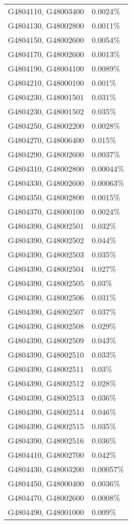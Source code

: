 \begin{longtable}[]{@{}ll@{}}
G4804110, G48003400 & 0.0024\% \\
G4804130, G48002800 & 0.0011\% \\
G4804150, G48002600 & 0.0054\% \\
G4804170, G48002600 & 0.0013\% \\
G4804190, G48004100 & 0.0089\% \\
G4804210, G48000100 & 0.001\% \\
G4804230, G48001501 & 0.031\% \\
G4804230, G48001502 & 0.035\% \\
G4804250, G48002200 & 0.0028\% \\
G4804270, G48006400 & 0.015\% \\
G4804290, G48002600 & 0.0037\% \\
G4804310, G48002800 & 0.00044\% \\
G4804330, G48002600 & 0.00063\% \\
G4804350, G48002800 & 0.0015\% \\
G4804370, G48000100 & 0.0024\% \\
G4804390, G48002501 & 0.032\% \\
G4804390, G48002502 & 0.044\% \\
G4804390, G48002503 & 0.035\% \\
G4804390, G48002504 & 0.027\% \\
G4804390, G48002505 & 0.03\% \\
G4804390, G48002506 & 0.031\% \\
G4804390, G48002507 & 0.037\% \\
G4804390, G48002508 & 0.029\% \\
G4804390, G48002509 & 0.043\% \\
G4804390, G48002510 & 0.033\% \\
G4804390, G48002511 & 0.03\% \\
G4804390, G48002512 & 0.028\% \\
G4804390, G48002513 & 0.036\% \\
G4804390, G48002514 & 0.046\% \\
G4804390, G48002515 & 0.035\% \\
G4804390, G48002516 & 0.036\% \\
G4804410, G48002700 & 0.042\% \\
G4804430, G48003200 & 0.00057\% \\
G4804450, G48000400 & 0.0036\% \\
G4804470, G48002600 & 0.0008\% \\
G4804490, G48001000 & 0.009\% \\

\end{longtable}
